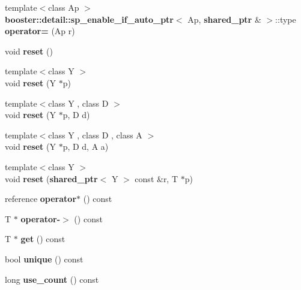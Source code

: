 \begin{DoxyCompactItemize}
\item 
{\footnotesize template$<$class Ap $>$ }\\{\bf booster\+::detail\+::sp\+\_\+enable\+\_\+if\+\_\+auto\+\_\+ptr}$<$ Ap, {\bf shared\+\_\+ptr} \& $>$\+::type {\bfseries operator=} (Ap r)\label{classbooster_1_1shared__ptr_af5a66535e99a277e8978907cca6fff94}

\item 
void {\bfseries reset} ()\label{classbooster_1_1shared__ptr_a717dbef22f028012e7add2674b87729d}

\item 
{\footnotesize template$<$class Y $>$ }\\void {\bfseries reset} (Y $\ast$p)\label{classbooster_1_1shared__ptr_a4f4524d782c5e6a87ba28607bc99674e}

\item 
{\footnotesize template$<$class Y , class D $>$ }\\void {\bfseries reset} (Y $\ast$p, D d)\label{classbooster_1_1shared__ptr_aa04c7a4f022b560408d66518b7c116ff}

\item 
{\footnotesize template$<$class Y , class D , class A $>$ }\\void {\bfseries reset} (Y $\ast$p, D d, A a)\label{classbooster_1_1shared__ptr_acff6191062f3a6ba1c4cf4bb8477ea11}

\item 
{\footnotesize template$<$class Y $>$ }\\void {\bfseries reset} ({\bf shared\+\_\+ptr}$<$ Y $>$ const \&r, T $\ast$p)\label{classbooster_1_1shared__ptr_a982b7dd9a9897bc539194c0a69f56851}

\item 
reference {\bfseries operator$\ast$} () const \label{classbooster_1_1shared__ptr_a41d1cb065b9e10152333148be2124d59}

\item 
T $\ast$ {\bfseries operator-\/$>$} () const \label{classbooster_1_1shared__ptr_ab2f5866801861c8a80468d28be225459}

\item 
T $\ast$ {\bfseries get} () const \label{classbooster_1_1shared__ptr_a0b3b71ea33c2284ae4fc52c350ff19b4}

\item 
bool {\bfseries unique} () const \label{classbooster_1_1shared__ptr_a852bb19a9dbba89a526c3f10bee70489}

\item 
long {\bfseries use\+\_\+count} () const \label{classbooster_1_1shared__ptr_a99907f1bd1bc3b992d091b78455ca17c}


\end{DoxyCompactItemize}

